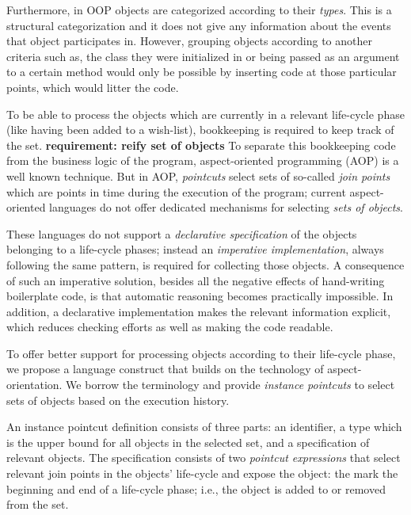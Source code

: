 \documentclass{llncs}
\begin{document}
Furthermore, in OOP objects are categorized according to their \emph{types}.
This is a structural categorization and it does not give any information about the events that object participates in.
However, grouping objects according to another criteria such as, the class they were initialized in or being passed as an argument to a certain method would only be possible by inserting code at those particular points, which would litter the code.

To be able to process the objects which are currently in a relevant life-cycle phase (like having been added to a wish-list), bookkeeping is required to keep track of the set. \textbf{requirement: reify set of objects} To separate this bookkeeping code from the business logic of the program, aspect-oriented programming (AOP) is a well known technique. But in AOP, \emph{pointcuts} select sets of so-called \emph{join points} which are points in time during the execution of the program; current aspect-oriented languages do not offer dedicated mechanisms for selecting \emph{sets of objects}.

These languages do not support a \emph{declarative specification} of the objects belonging to a life-cycle phases; instead an \emph{imperative implementation}, always following the same pattern, is required for collecting those objects.
A consequence of such an imperative solution, besides all the negative effects of hand-writing boilerplate code, is that automatic reasoning becomes practically impossible.
In addition, a declarative implementation makes the relevant information explicit, which reduces checking efforts as well as making the code readable.

To offer better support for processing objects according to their life-cycle phase, we propose a language construct that builds on the technology of aspect-orientation.
We borrow the terminology and provide \emph{instance pointcuts} to select sets of objects based on the execution history.

An instance pointcut definition consists of three parts: an identifier, a type which is the upper bound for all objects in the selected set, and a specification of relevant objects.
The specification consists of two \emph{pointcut expressions} that select relevant join points in the objects' life-cycle and expose the object: the mark the beginning and end of a life-cycle phase; i.e., the object is added to or removed from the set.
\end{document}
